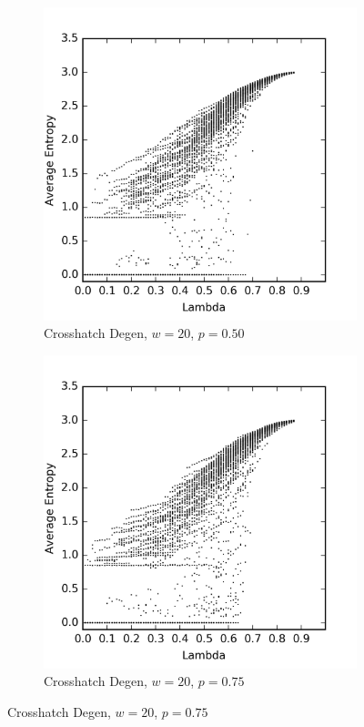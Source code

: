 \documentclass[a4paper,11pt]{article}
\begin{document}
\begin{figure}[htp]
\begin{subfigure}[t]{0.4\textwidth}
\end{subfigure}
~
\begin{subfigure}[t]{0.4\textwidth}
  \centering
  \includegraphics[width=\textwidth]{ch6_figs/ch_w20_p50_entropy_scatter}
  \caption{Crosshatch Degen, $w=20$, $p=0.50$}

\end{subfigure}

\begin{subfigure}[t]{0.4\textwidth}
  \centering
  \includegraphics[width=\textwidth]{ch6_figs/ch_w20_p75_entropy_scatter}
  \caption{Crosshatch Degen, $w=20$, $p=0.75$}


\end{subfigure}
\end{figure}
\end{document}
